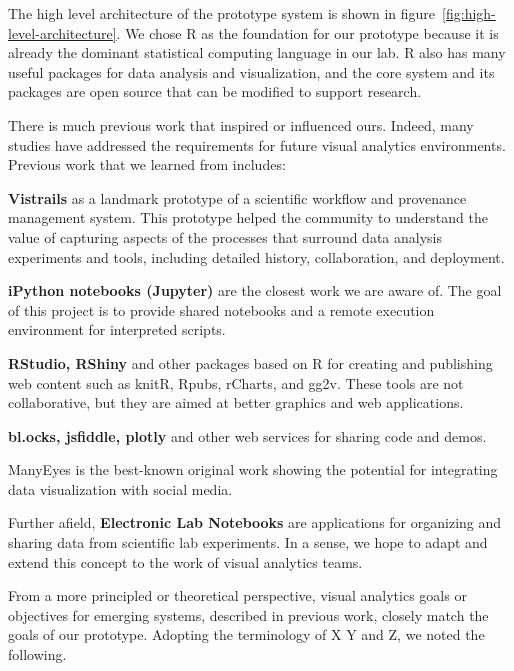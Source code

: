 The high level architecture of the prototype system
is shown in figure~\ref{fig:high-level-architecture}.
We chose R as the foundation for our prototype because it is already
the dominant statistical computing language in our lab.
R also has many useful packages for data analysis and visualization,
and the core system and its packages are open source that can be modified to
support research. 

There is much previous work that inspired or influenced ours.
Indeed, many studies have addressed the requirements for future visual
analytics environments.
Previous work that we learned from includes:

{\bf Vistrails} as a landmark prototype of a scientific workflow
and provenance management system. This prototype helped the community
to understand the value of capturing aspects of the processes that
surround data analysis experiments and tools, including detailed
history, collaboration, and deployment.

{\bf iPython notebooks (Jupyter)} are the closest work we are aware of.
The goal of this project is to provide shared notebooks and a remote
execution environment for interpreted scripts. 

{\bf RStudio, RShiny} and other packages based on R for creating and
publishing web content such as knitR, Rpubs, rCharts, and gg2v.
These tools are not collaborative, but they are aimed at better
graphics and web applications.

{\bf bl.ocks, jsfiddle, plotly} and other web services for sharing code
and demos.

{ManyEyes} is the best-known original work showing the potential for
integrating data visualization with social media.

Further afield, {\bf Electronic Lab Notebooks} are applications for organizing
and sharing data from scientific lab experiments\cite{Rubacha:2011:ELN}.
In a sense, we hope to adapt and extend this concept to the work of
visual analytics teams.

From a more principled or theoretical perspective, visual analytics goals
or objectives for emerging systems, described in previous work, closely match
the goals of our prototype. Adopting the terminology of X Y and Z, we noted
the following.

